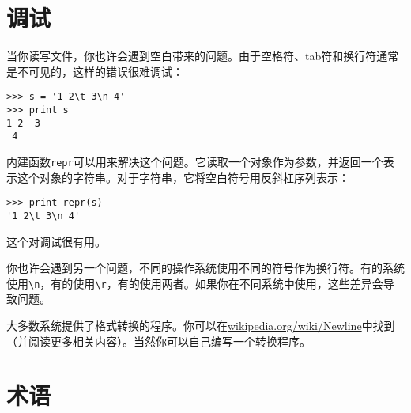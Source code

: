 \section{调试}


当你读写文件，你也许会遇到空白带来的问题。由于空格符、tab符和换行符通常是不可见的，这样的错误很难调试：

\beforeverb
\begin{verbatim}
>>> s = '1 2\t 3\n 4'
>>> print s
1 2	 3
 4
\end{verbatim}
\afterverb


内建函数{\tt repr}可以用来解决这个问题。它读取一个对象作为参数，并返回一个表示这个对象的字符串。对于字符串，它将空白符号用反斜杠序列表示：

\beforeverb
\begin{verbatim}
>>> print repr(s)
'1 2\t 3\n 4'
\end{verbatim}
\afterverb

这个对调试很有用。

你也许会遇到另一个问题，不同的操作系统使用不同的符号作为换行符。有的系统使用\verb"\n"，有的使用\verb"\r"，有的使用两者。如果你在不同系统中使用，这些差异会导致问题。

大多数系统提供了格式转换的程序。你可以在\url{wikipedia.org/wiki/Newline}中找到（并阅读更多相关内容）。当然你可以自己编写一个转换程序。


\section{术语}

